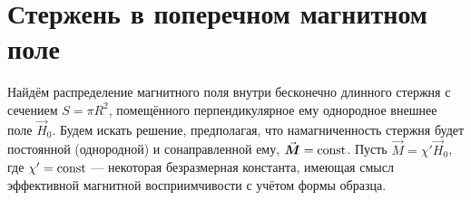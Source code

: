 %
%


\labsupplement

\section*{Стержень в поперечном магнитном поле}


%
%

Найдём распределение магнитного поля внутри бесконечно длинного стержня
с сечением $S=\pi R^2$,
помещённого перпендикулярное ему однородное внешнее поле $\vec{H}_0$.
Будем искать решение, предполагая, что намагниченность стержня будет
постоянной (однородной) и сонаправленной ему, $\vec M=\const$. Пусть
$\vec M=\chi' \vec{H}_0$, где
$\chi'=\mathrm{const}$ --- некоторая безразмерная константа, имеющая смысл эффективной
магнитной восприимчивости с учётом формы образца.


